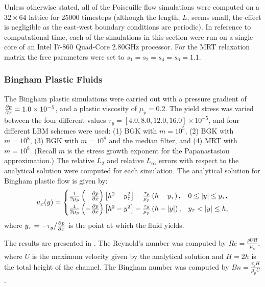 \documentclass{article}
\begin{document}
Unless otherwise stated, all of the Poiseuille flow simulations were computed on a $32 \times 64$ lattice for 25000 timesteps (although the length, $L$, seems small, the effect is negligible as the east-west boundary conditions are periodic).
In reference to computational time, each of the simulations in this section were run on a single core of an Intel I7-860 Quad-Core 2.80GHz processor.
For the MRT relaxation matrix the free parameters were set to $s_1 = s_2 = s_4 = s_6 = 1.1$.

\subsubsection{Bingham Plastic Fluids} \label{sec:poise-bing}

The Bingham plastic simulations were carried out with a pressure gradient of $\frac{\partial p}{\partial x} = 1.0 \times 10^{-5}$, and a plastic viscosity of $\mu_p = 0.2$.
The yield stress was varied between the four different values $\tau_y = [4.0, 8.0, 12.0, 16.0] \times 10^{-5}$, and four different LBM schemes were used: (1) BGK with $m = 10^5$, (2) BGK with $m = 10^8$, (3) BGK with $m = 10^8$ and the median filter, and (4) MRT with $m = 10^8$. 
(Recall $m$ is the stress growth exponent for the Papanastasiou approximation.)
The relative $L_2$ and relative $L_{\infty}$ errors with respect to the analytical solution were computed for each simulation.
The analytical solution for Bingham plastic flow is given by:
\begin{equation} \label{eq:analytical-bingham}
u_x(y) = \begin{cases}
\frac{1}{2 \mu_p} \left(-\frac{\partial p}{\partial x}\right) \left[h^2 - y_{\tau}^2 \right] - \frac{\tau_y}{\mu_p} \left(h - y_{\tau}\right), & 0 \leq |y| \leq y_{\tau}, \\
\frac{1}{2 \mu_p} \left(-\frac{\partial p}{\partial x}\right) \left[h^2 - y^2 \right] - \frac{\tau_y}{\mu_p} \left(h - |y|\right), & y_{\tau} < |y| \leq h,
\end{cases}
\end{equation}
\noindent where $y_{\tau} = -\tau_y / \frac{\partial p}{\partial x}$ is the point at which the fluid yields.

The results are presented in .
The Reynold's number was computed by $Re = \frac{\rho U H}{\mu_p}$, where $U$ is the maximum velocity given by the analytical solution and $H = 2h$ is the total height of the channel.
The Bingham number was computed by $Bn = \frac{\tau_y H}{\mu_p U}$.

\end{document}
